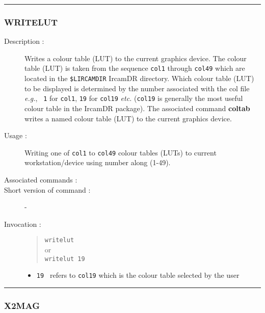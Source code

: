 \hrule
\subsubsection*{\label{WRITELUT}WRITELUT}

\begin{description}

\item[Description :] Writes a colour table (LUT) to the current graphics
device. The colour table (LUT) is taken from the sequence {\tt col1}
through {\tt col49} which are located in the {\tt \$LIRCAMDIR} {\sc
IrcamDR} directory.  Which colour table (LUT) to be displayed is
determined by the number associated with the col file \emph{e.g.}, {\tt
1} for {\tt col1}, {\tt 19} for {\tt col19} \emph{etc.} ({\tt col19} is
generally the most useful colour table in the {\sc IrcamDR} package).
The associated command {\bf coltab} writes a named colour table (LUT)
to the current graphics device.

\item[Usage :] Writing one of {\tt col1} to {\tt col49} colour tables
(LUTs) to current workstation/device using number along (1-49).
\item[Associated commands :] {\tt {}}
\item[Short version of command :] -
\item[Invocation :]

\begin{quote}{\tt  writelut }\\
or \\
{\tt writelut 19 }
\end{quote}

\begin{itemize}

\item {\tt 19 } refers to {\tt col19} which  is the colour table selected by
 the user
\end{itemize}

\end{description}

\hrule
\subsubsection*{\label{X2MAG}X2MAG}

